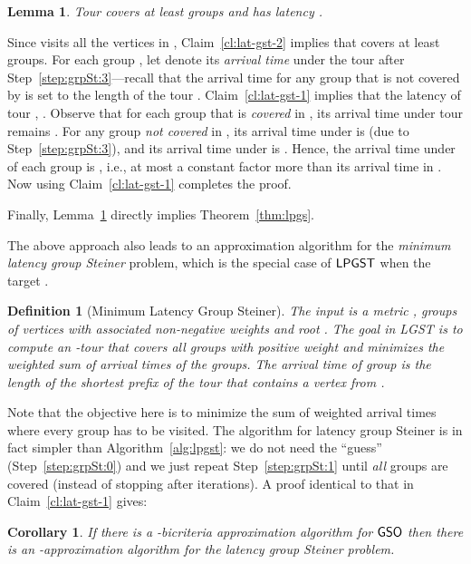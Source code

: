 \documentclass[11pt]{article}
\newtheorem{lemma}[thm]{Lemma}
\newtheorem{corollary}[thm]{Corollary}
\newtheorem{definition}{Definition}
\def\lpgst{\ensuremath{{\sf LPGST}}\xspace}
\def\gso{\ensuremath{{\sf GSO}}\xspace}
\def\lgs{{\sf LGST}\xspace}
\newenvironment{pf}{

\noindent{\bf Proof:}} {\hfill


}
\begin{document}
\begin{lemma}\label{th:grp-lat}
  Tour  covers at least  groups
  and has latency .
\end{lemma}
\begin{pf}
  Since  visits all the vertices in ,
  Claim~\ref{cl:lat-gst-2} implies that  covers at least
   groups. For each group , let  denote
  its \emph{arrival time} under the tour  after 
  Step~\ref{step:grpSt:3}---recall that the arrival time  for
  any group  that is not covered by  is set to the length of
  the tour . Claim~\ref{cl:lat-gst-1} implies that the latency
  of tour , .
  Observe that for each group  that is {\em covered} in , its arrival
  time under tour  remains . For any
  group  {\em not covered} in , its arrival time under 
is  (due to Step~\ref{step:grpSt:3}), and its arrival time under  is . Hence, the arrival time under  of each group  is , i.e., at most a constant factor more
  than its arrival time in . Now using Claim~\ref{cl:lat-gst-1}
  completes the proof.
\end{pf}

Finally, Lemma~\ref{th:grp-lat} directly implies Theorem~\ref{thm:lpgs}.




\medskip
{}  The above approach also leads to an 
 approximation algorithm for the {\em minimum latency group Steiner}
problem, which is the special case of \lpgst when the target . 
\smallskip

\begin{definition}[Minimum Latency Group Steiner]\label{def:lgst} The input is 
a metric ,  groups of vertices  with associated non-negative weights
 and root . The goal in \lgs is to compute an -tour 
 that covers all groups with positive weight and minimizes the weighted sum of arrival times of the groups.  
The \emph{arrival  time} of group  is the length of the shortest prefix of the tour  
that contains a vertex from .
\end{definition}
\smallskip
Note that the objective here is to minimize the sum
of weighted arrival times where  every group has to be visited. 
 The algorithm for latency group Steiner is in fact simpler than Algorithm~\ref{alg:lpgst}: we do not need the ``guess''  (Step~\ref{step:grpSt:0}) and we just repeat Step~\ref{step:grpSt:1} until {\em all} groups are covered (instead of stopping after 
iterations). A proof identical to that in Claim~\ref{cl:lat-gst-1} gives:
\begin{corollary}\label{cor:lgs} 
If there is a -bicriteria approximation algorithm for \gso then there is an -approximation algorithm for the latency group Steiner problem.
\end{corollary}
\end{document}
